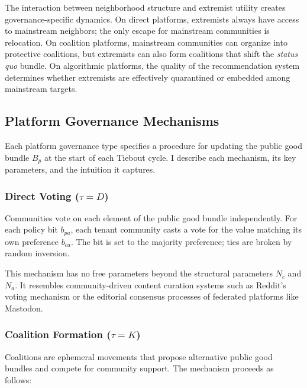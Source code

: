 \documentclass[12pt]{article}
\begin{document}
\noindent The interaction between neighborhood structure and extremist utility creates governance-specific dynamics. On direct platforms, extremists always have access to mainstream neighbors; the only escape for mainstream communities is relocation. On coalition platforms, mainstream communities can organize into protective coalitions, but extremists can also form coalitions that shift the \textit{status quo} bundle. On algorithmic platforms, the quality of the recommendation system determines whether extremists are effectively quarantined or embedded among mainstream targets.

\subsection{Platform Governance Mechanisms}
\label{sec:governance}

Each platform governance type specifies a procedure for updating the public good bundle $B_p$ at the start of each Tiebout cycle. I describe each mechanism, its key parameters, and the intuition it captures.

\subsubsection{Direct Voting ($\tau = D$)}

Communities vote on each element of the public good bundle independently. For each policy bit $b_{pa}$, each tenant community casts a vote for the value matching its own preference $b_{ca}$. The bit is set to the majority preference; ties are broken by random inversion.

This mechanism has no free parameters beyond the structural parameters $N_c$ and $N_a$. It resembles community-driven content curation systems such as Reddit's voting mechanism or the editorial consensus processes of federated platforms like Mastodon.

\subsubsection{Coalition Formation ($\tau = K$)}

Coalitions are ephemeral movements that propose alternative public good bundles and compete for community support. The mechanism proceeds as follows:
\end{document}
